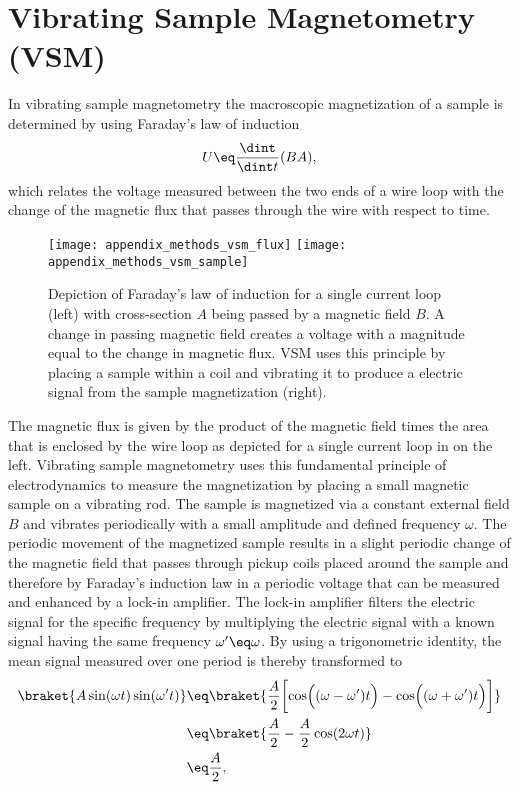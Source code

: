 \documentclass[\main/dresen_thesis.tex]{subfiles}
\begin{document}
  \section{Vibrating Sample Magnetometry (VSM)}
    \label{ch:methods:vsm}
    In vibrating sample magnetometry the macroscopic magnetization of a sample is determined by using Faraday's law of induction
    \begin{align}
      U \eq \frac{\dint }{\dint t} (BA),
    \end{align}
    which relates the voltage measured between the two ends of a wire loop with the change of the magnetic flux that passes through the wire with respect to time.
    \begin{figure}[tb]
      \centering
      \texttt{[image: appendix\_methods\_vsm\_flux]}
      \texttt{[image: appendix\_methods\_vsm\_sample]}
      \caption{\label{fig:methods:vsm:flux}Depiction of Faraday's law of induction for a single current loop (left) with cross-section $A$ being passed by a magnetic field $B$. A change in passing magnetic field creates a voltage with a magnitude equal to the change in magnetic flux. VSM uses this principle by placing a sample within a coil and vibrating it to produce a electric signal from the sample magnetization (right).}
    \end{figure}
    The magnetic flux is given by the product of the magnetic field times the area that is enclosed by the wire loop as depicted for a single current loop in  on the left.
    Vibrating sample magnetometry uses this fundamental principle of electrodynamics to measure the magnetization by placing a small magnetic sample on a vibrating rod.
    The sample is magnetized via a constant external field $B$ and vibrates periodically with a small amplitude and defined frequency $\omega$.
    The periodic movement of the magnetized sample results in a slight periodic change of the magnetic field that passes through pickup coils placed around the sample and therefore by Faraday's induction law in a periodic voltage that can be measured and enhanced by a lock-in amplifier.
    The lock-in amplifier filters the electric signal for the specific frequency by multiplying the electric signal with a known signal having the same frequency $\omega^\prime \eq \omega$.
    By using a trigonometric identity, the mean signal measured over one period is thereby transformed to
    \begin{align}
      \begin{split}
        \braket{A \sin(\omega t) \sin(\omega^\prime t)}
          &\eq \braket{\frac{A}{2} \biggl[ \cos\Bigl((\omega - \omega^\prime) t \Bigr) - \cos\Bigl((\omega + \omega^\prime) t\Bigr) \biggr]}\\
          &\eq \braket{\frac{A}{2} - \frac{A}{2} \cos(2\omega t)}\\
          &\eq \frac{A}{2},
      \end{split}
    \end{align}
\end{document}
